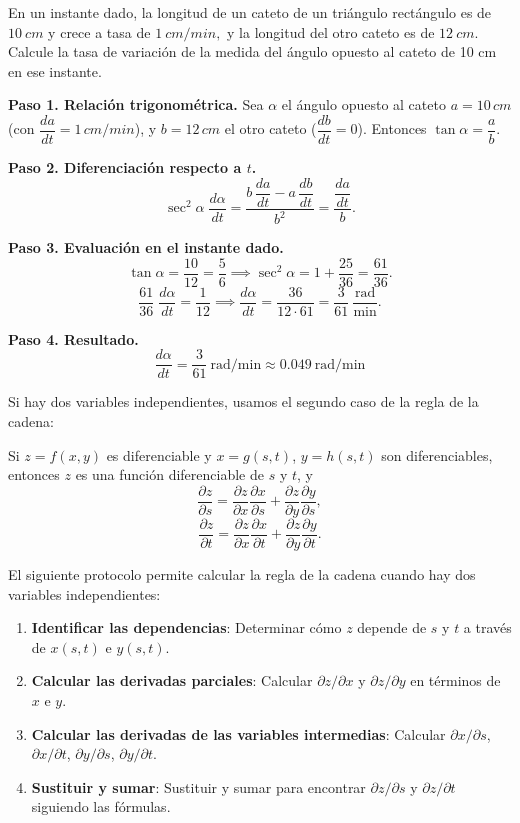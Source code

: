 \begin{prob}
En un instante dado, la longitud de un cateto de un triángulo rectángulo es de $10\ cm$ y crece a tasa de $1\ cm/min,$ y la longitud del otro cateto es de $12\ cm.$ Calcule la tasa de variación de la medida del ángulo opuesto al cateto de 10 cm en ese instante.
\begin{myproof}
\textbf{Paso 1. Relación trigonométrica.}
Sea $\alpha$ el ángulo opuesto al cateto $a=10\,cm$ (con $\dfrac{da}{dt}=1\,cm/min$), y $b=12\,cm$ el otro cateto ($\dfrac{db}{dt}=0$). Entonces $\tan\alpha=\dfrac{a}{b}$.

\textbf{Paso 2. Diferenciación respecto a $t$.}
\[
\sec^2\!\alpha\;\frac{d\alpha}{dt}
=\frac{b\,\dfrac{da}{dt}-a\,\dfrac{db}{dt}}{b^2}
=\frac{\dfrac{da}{dt}}{b}.
\]

\textbf{Paso 3. Evaluación en el instante dado.}
\[
\tan\alpha=\frac{10}{12}=\frac{5}{6}\implies
\sec^2\!\alpha=1+\frac{25}{36}=\frac{61}{36}.
\]
\[
\frac{61}{36}\;\frac{d\alpha}{dt}=\frac{1}{12}\implies
\frac{d\alpha}{dt}=\frac{36}{12\cdot 61}=\frac{3}{61}\ \frac{\text{rad}}{\text{min}}.
\]

\textbf{Paso 4. Resultado.}
\[
\boxed{\dfrac{d\alpha}{dt}=\dfrac{3}{61}\ \text{rad/min}\approx 0.049\ \text{rad/min}}
\]
\end{myproof}
\end{prob}


Si hay dos variables independientes, usamos el segundo caso de la regla de la cadena: 
\begin{theorem}
Si $z = f(x, y)$ es diferenciable y $x = g(s, t)$, $y = h(s, t)$ son diferenciables, entonces $z$ es una función diferenciable de $s$ y $t$, y
\[
\frac{\partial z}{\partial s} = \frac{\partial z}{\partial x}\frac{\partial x}{\partial s} + \frac{\partial z}{\partial y}\frac{\partial y}{\partial s},
\]
\[
\frac{\partial z}{\partial t} = \frac{\partial z}{\partial x}\frac{\partial x}{\partial t} + \frac{\partial z}{\partial y}\frac{\partial y}{\partial t}.
\]
\end{theorem}

\begin{pasos} El siguiente protocolo permite calcular la regla de la cadena cuando hay dos variables independientes:
\begin{enumerate}
    \item \textbf{Identificar las dependencias}: Determinar cómo $z$ depende de $s$ y $t$ a través de $x(s,t)$ e $y(s,t)$.
    \item \textbf{Calcular las derivadas parciales}: Calcular $\partial z/\partial x$ y $\partial z/\partial y$ en términos de $x$ e $y$.
    \item \textbf{Calcular las derivadas de las variables intermedias}: Calcular $\partial x/\partial s$, $\partial x/\partial t$, $\partial y/\partial s$, $\partial y/\partial t$.
    \item \textbf{Sustituir y sumar}: Sustituir y sumar para encontrar $\partial z/\partial s$ y $\partial z/\partial t$ siguiendo las fórmulas.
\end{enumerate}
\end{pasos}

